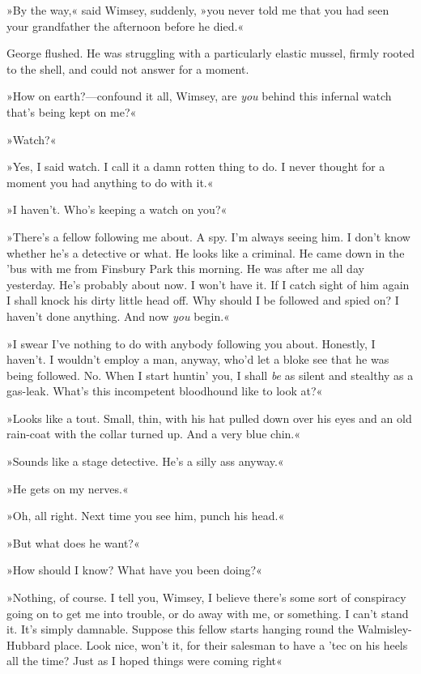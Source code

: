 »By the way,« said Wimsey, suddenly, »you never told me that you had seen your grandfather the afternoon before he died.«

George flushed. He was struggling with a particularly elastic mussel, firmly rooted to the shell, and could not answer for a moment.

»How on earth?---confound it all, Wimsey, are \textit{you} behind this infernal watch that's being kept on me?«

»Watch?«

»Yes, I said watch. I call it a damn rotten thing to do. I never thought for a moment you had anything to do with it.«

»I haven't. Who's keeping a watch on you?«

»There's a fellow following me about. A spy. I'm always seeing him. I don't know whether he's a detective or what. He looks like a criminal. He came down in the 'bus with me from Finsbury Park this morning. He was after me all day yesterday. He's probably about now. I won't have it. If I catch sight of him again I shall knock his dirty little head off. Why should I be followed and spied on? I haven't done anything. And now \textit{you} begin.«

»I swear I've nothing to do with anybody following you about. Honestly, I haven't. I wouldn't employ a man, anyway, who'd let a bloke see that he was being followed. No. When I start huntin' you, I shall \textit{be} as silent and stealthy as a gas-leak. What's this incompetent bloodhound like to look at?«

»Looks like a tout. Small, thin, with his hat pulled down over his eyes and an old rain-coat with the collar turned up. And a very blue chin.«

»Sounds like a stage detective. He's a silly ass anyway.«

»He gets on my nerves.«

»Oh, all right. Next time you see him, punch his head.«

»But what does he want?«

»How should I know? What have you been doing?«

»Nothing, of course. I tell you, Wimsey, I believe there's some sort of conspiracy going on to get me into trouble, or do away with me, or something. I can't stand it. It's simply damnable. Suppose this fellow starts hanging round the Walmisley-Hubbard place. Look nice, won't it, for their salesman to have a 'tec on his heels all the time? Just as I hoped things were coming right\longdash«

